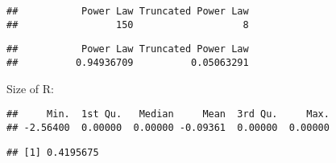 \documentclass[]{article}
\newenvironment{Shaded}{\begin{snugshade}}{\end{snugshade}}
\newcommand{\KeywordTok}[1]{\textcolor[rgb]{0.13,0.29,0.53}{\textbf{#1}}}
\newcommand{\NormalTok}[1]{#1}
\newcommand{\OperatorTok}[1]{\textcolor[rgb]{0.81,0.36,0.00}{\textbf{#1}}}
\newcommand{\StringTok}[1]{\textcolor[rgb]{0.31,0.60,0.02}{#1}}
\begin{document}
\begin{Shaded}
\end{Shaded}

\begin{verbatim}
##           Power Law Truncated Power Law 
##                 150                   8
\end{verbatim}

\begin{Shaded}
\end{Shaded}

\begin{verbatim}
##           Power Law Truncated Power Law 
##          0.94936709          0.05063291
\end{verbatim}

Size of R:

\begin{Shaded}
\end{Shaded}

\begin{verbatim}
##     Min.  1st Qu.   Median     Mean  3rd Qu.     Max. 
## -2.56400  0.00000  0.00000 -0.09361  0.00000  0.00000
\end{verbatim}

\begin{Shaded}
\end{Shaded}

\begin{verbatim}
## [1] 0.4195675
\end{verbatim}
\end{document}
